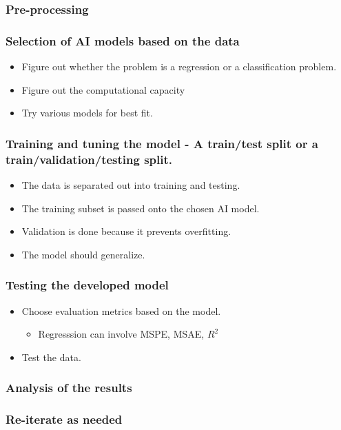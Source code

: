 \documentclass[11pt]{article}
\begin{document}
\subsubsection{Pre-processing}
\label{sec:org8246e86}
\subsubsection{Selection of AI models based on the data}
\label{sec:orge2d102e}
\begin{itemize}
\item Figure out whether the problem is a regression or a classification problem.
\item Figure out the computational capacity
\item Try various models for best fit.
\end{itemize}
\subsubsection{Training and tuning the model - A train/test split or a train/validation/testing split.}
\label{sec:orgdf3cce2}
\begin{itemize}
\item The data is separated out into training and testing.
\item The training subset is passed onto the chosen AI model.
\item Validation is done because it prevents overfitting.
\item The model should generalize.
\end{itemize}
\subsubsection{Testing the developed model}
\label{sec:org8c95e78}
\begin{itemize}
\item Choose evaluation metrics based on the model.
\begin{itemize}
\item Regresssion can involve MSPE, MSAE, \(R^2\)
\end{itemize}
\item Test the data.
\end{itemize}
\subsubsection{Analysis of the results}
\label{sec:org6835fde}
\subsubsection{Re-iterate as needed}
\label{sec:org4989a8e}
\end{document}
